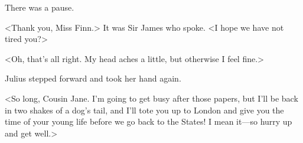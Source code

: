 There was a pause.

<Thank you, Miss Finn.> It was Sir James who spoke. <I hope we have not tired you?>

<Oh, that's all right. My head aches a little, but otherwise I feel fine.>

Julius stepped forward and took her hand again.

<So long, Cousin Jane. I'm going to get busy after those papers, but I'll be back in two shakes of a dog's tail, and I'll tote you up to London and give you the time of your young life before we go back to the States! I mean it—so hurry up and get well.> 